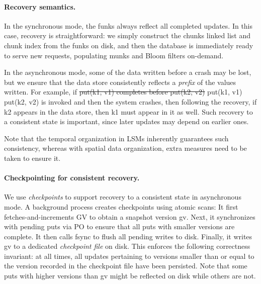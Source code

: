 \documentclass[sigplan,10pt]{acmart}
\newcommand{\code}[1]{\textsf{\fontsize{9}{11}\selectfont #1}}
\providecommand{\DIFadd}[1]{{\protect\color{blue}\uwave{#1}}} %
\providecommand{\DIFdel}[1]{{\protect\color{red}\sout{#1}}}                      %
\providecommand{\DIFaddbegin}{} %
\providecommand{\DIFaddend}{} %
\providecommand{\DIFdelbegin}{} %
\providecommand{\DIFdelend}{} %
\begin{document}
\paragraph{Recovery semantics.}
In the synchronous mode, 
the funks always reflect all completed updates. In this case, recovery is straightforward: we simply construct
the chunks linked list and chunk index from the funks on disk, and then the database is immediately ready to serve new requests, populating munks and Bloom filters on-demand.  

In the asynchronous mode, some of the  data written before a crash may be lost, but we  
ensure that the data store consistently reflects a \emph{prefix} of the  values written.
For example, if \DIFdelbegin \DIFdel{put(k1, v1) completes before put(k2, v2) 
}\DIFdelend \DIFaddbegin \code{put(k1, v1)} \DIFadd{completes before }\code{put(k2, v2)} 
\DIFaddend is invoked and then the system crashes, then following the recovery, 
if \code{k2} appears in the data store, then \code{k1} must appear in it as well. 
Such recovery to a consistent state is important, since later updates may depend on earlier ones. 

Note that the temporal organization in LSMs inherently guarantees such consistency, whereas with spatial data organization,
extra measures need to be taken to ensure it.

\paragraph{Checkpointing for consistent recovery.}

We use \emph{checkpoints} to support recovery to a consistent state in asynchronous mode.
A background process creates checkpoints using atomic scans: 
It first fetches-and-increments GV to obtain a snapshot version \code{gv}.  Next, 
it synchronizes with pending puts via PO to ensure that all puts with smaller versions are complete. 
It then calls \code{fsync} to flush all pending writes to disk.
Finally, it writes \code{gv} to a dedicated \emph{checkpoint file} on disk.
This enforces the following correctness invariant: at all times, all updates pertaining to versions smaller 
than or equal to the version recorded in the checkpoint file have been persisted.
Note that some puts with higher versions than \code{gv} might be reflected on disk while others are not. 
\end{document}
